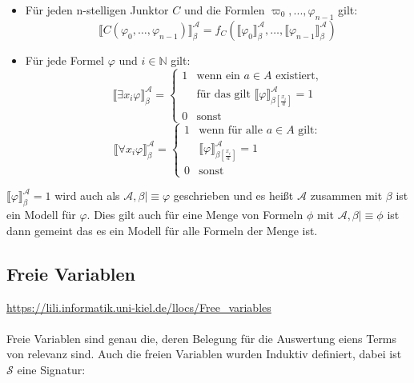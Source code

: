 \documentclass[twocolumn]{article}
\newcommand{\model}{\mathrel{{\vert}\!{\equiv}}}
\begin{document}
    \begin{itemize}
        \item Für jeden n-stelligen Junktor $C$ und die Formlen $\varpi_0,...,\varphi_{n-1}$ gilt:
            $$ \llbracket C (\varphi_0,\dots,\varphi_{n-1})\rrbracket_{\beta}^{\mathcal A} = f_C(\llbracket \varphi_0 \rrbracket_{\beta}^{\mathcal A}, \dots,\llbracket \varphi_{n-1} \rrbracket_{\beta}^{\mathcal A}) $$
        \item Für jede Formel $\varphi$ und $i \in \mathbb N$ gilt:
            $$ \llbracket \exists x_i \varphi \rrbracket_{\beta}^{\mathcal A} = 
            \begin{cases}
                1 & \text{wenn ein } a \in A \text{ existiert,} \\ & \text{für das gilt } \llbracket \varphi \rrbracket_{\beta [\frac{x_i}{a}]}^{\mathcal A} = 1\\
                0 & \text{sonst}
            \end{cases}$$
            $$ \llbracket \forall x_i \varphi \rrbracket_{\beta}^{\mathcal A} = 
            \begin{cases}
                1 & \text{wenn für alle } a \in A \text{ gilt:} \\ &  \llbracket \varphi \rrbracket_{\beta [\frac{x_i}{a}]}^{\mathcal A} = 1\\
                0 & \text{sonst}
            \end{cases}$$
    \end{itemize}
    $ \llbracket \varphi \rrbracket_{\beta}^{\mathcal A} = 1$ wird auch als $\mathcal A, \beta \model \varphi$ geschrieben und es heißt $\mathcal A$ zusammen mit $\beta$ ist ein Modell für $\varphi$. Dies gilt auch für eine Menge von Formeln $\phi$ mit $\mathcal A, \beta \model \phi$ ist dann gemeint das es ein Modell für alle Formeln der Menge ist.

    \subsection{Freie Variablen}
    \url{https://lili.informatik.uni-kiel.de/llocs/Free_variables}\\\\
    Freie Variablen sind genau die, deren Belegung für die Auswertung eiens Terms von relevanz sind. Auch die freien Variablen wurden Induktiv definiert, dabei ist $\mathcal S$ eine Signatur:\\\\
\end{document}
